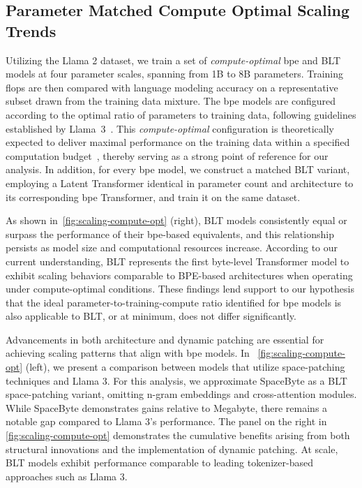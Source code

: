 \subsection{Parameter Matched Compute Optimal Scaling Trends}
\label{section:parameter-matched-scaling}
Utilizing the Llama 2 dataset, we train a set of \textit{compute-optimal} bpe and {\textsc BLT} models at four parameter scales, spanning from 1B to 8B parameters. Training flops are then compared with language modeling accuracy on a representative subset drawn from the training data mixture. The bpe models are configured according to the optimal ratio of parameters to training data, following guidelines established by Llama~3~\citep{dubey2024llama}. This \textit{compute-optimal} configuration is theoretically expected to deliver maximal performance on the training data within a specified computation budget~\citep{hoffmann2022training}, thereby serving as a strong point of reference for our analysis. In addition, for every bpe model, we construct a matched {\textsc BLT} variant, employing a Latent Transformer identical in parameter count and architecture to its corresponding bpe Transformer, and train it on the same dataset.

As shown in~\autoref{fig:scaling-compute-opt} (right), {\textsc BLT} models consistently equal or surpass the performance of their bpe-based equivalents, and this relationship persists as model size and computational resources increase. According to our current understanding, {\textsc BLT} represents the first byte-level Transformer model to exhibit scaling behaviors comparable to BPE-based architectures when operating under compute-optimal conditions. These findings lend support to our hypothesis that the ideal parameter-to-training-compute ratio identified for bpe models is also applicable to {\textsc BLT}, or at minimum, does not differ significantly.

Advancements in both architecture and dynamic patching are essential for achieving scaling patterns that align with bpe models. In ~\autoref{fig:scaling-compute-opt} (left), we present a comparison between models that utilize space-patching techniques and Llama 3. For this analysis, we approximate SpaceByte \citep{slagle2024spacebyte} as a {\textsc BLT} space-patching variant, omitting n-gram embeddings and cross-attention modules. While SpaceByte demonstrates gains relative to Megabyte, there remains a notable gap compared to Llama 3's performance. The panel on the right in \autoref{fig:scaling-compute-opt} demonstrates the cumulative benefits arising from both structural innovations and the implementation of dynamic patching. At scale, {\textsc BLT} models exhibit performance comparable to leading tokenizer-based approaches such as Llama 3.

